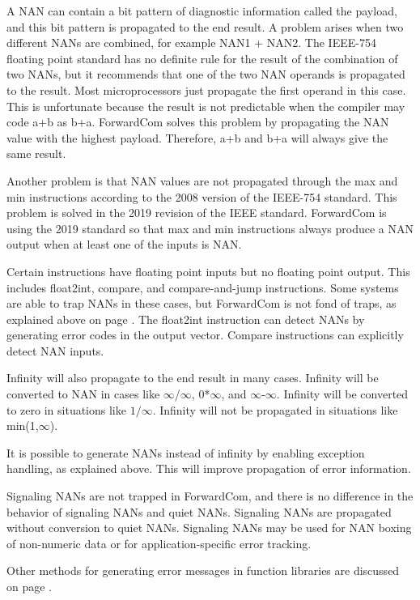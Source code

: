 \documentclass[forwardcom.tex]{subfiles}
\begin{document}
A NAN can contain a bit pattern of diagnostic information called the payload, and this bit pattern is propagated to the end result. A problem arises when two different NANs are combined, for example NAN1 + NAN2. The IEEE-754 floating point standard  has no definite rule for the result of the combination of two NANs, but it recommends that one of the two NAN operands is propagated to the result. Most microprocessors just propagate the first operand in this case. This is unfortunate because the result is not predictable when the compiler may code a+b as b+a. ForwardCom solves this problem by propagating the NAN value with the highest payload. Therefore, a+b and b+a will always give the same result.
\vv

Another problem is that NAN values are not propagated through the max and min instructions according to the 2008 version of the IEEE-754 standard. 
This problem is solved in the 2019 revision of the IEEE standard. ForwardCom is using the 2019 standard so that max and min instructions always produce a NAN output when at least one of the inputs is NAN.
\vv

Certain instructions have floating point inputs but no floating point output. 
This includes float2int, compare, and compare-and-jump instructions. 
Some systems are able to trap NANs in these cases, but ForwardCom is not fond of traps, as explained above on page \pageref{FloatingPointErrors}. The float2int instruction can detect NANs by generating error codes in the output vector. Compare instructions can explicitly detect NAN inputs.
\vv

Infinity will also propagate to the end result in many cases. 
Infinity will be converted to NAN in cases like $\infty$/$\infty$, 0*$\infty$, and $\infty$-$\infty$.
Infinity will be converted to zero in situations like $1/\infty$. Infinity will not be propagated in situations like min(1,$\infty$).
\vv

It is possible to generate NANs instead of infinity by enabling exception handling, as explained above. This will improve propagation of error information. 
\vv

Signaling NANs are not trapped in ForwardCom, and there is no difference in the behavior of signaling NANs and quiet NANs. Signaling NANs are propagated without conversion to quiet NANs. Signaling NANs may be used for NAN boxing of non-numeric data or for application-specific error tracking.
\vv

Other methods for generating error messages in function libraries are discussed on page \pageref{errorMessageHandling}.
\vv
\end{document}
